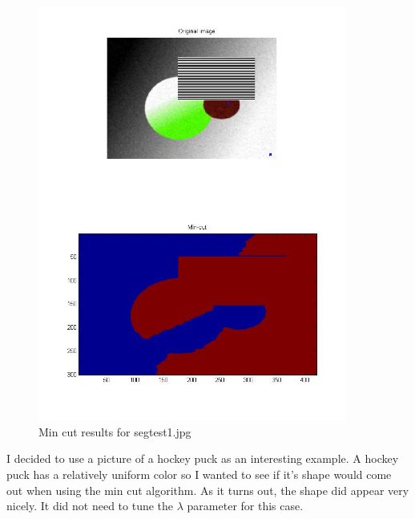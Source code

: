 \documentclass[11pt,psfig]{article}
\begin{document}
\begin{figure}[H]
\centering
\includegraphics[width=4in]{prob5plotA_2.jpg}
\caption{Min cut results for segtest1.jpg}
\end{figure}

I decided to use a picture of a hockey puck as an interesting example. A hockey puck has a relatively uniform color so I wanted to see if it's shape would come out when using the min cut algorithm. As it turns out, the shape did appear very nicely. It did not need to tune the $\lambda$ parameter for this case. 
\end{document}
